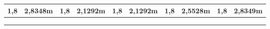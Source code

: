 \begin{center}
\begin{tabular}{cccccccccc}
\multicolumn{1}{|c|}{1,8}                                    & \multicolumn{1}{c|}{2,8348m}                                & \multicolumn{1}{c|}{1,8}                                    & \multicolumn{1}{c|}{2,1292m}                                & \multicolumn{1}{c|}{1,8}                                    & \multicolumn{1}{c|}{2,1292m}                                & \multicolumn{1}{c|}{1,8}                                    & \multicolumn{1}{c|}{2,5528m}                                & \multicolumn{1}{c|}{1,8}                                    & \multicolumn{1}{c|}{2,8349m}                                \\ \hline
\multicolumn{1}{l}{}                                         & \multicolumn{1}{l}{}                                        & \multicolumn{1}{l}{}                                        & \multicolumn{1}{l}{}                                        & \multicolumn{1}{l}{}                                        & \multicolumn{1}{l}{}                                        & \multicolumn{1}{l}{}                                        & \multicolumn{1}{l}{}                                        & \multicolumn{1}{l}{}                                        & \multicolumn{1}{l}{}                                        \\
\multicolumn{1}{l}{}                                         & \multicolumn{1}{l}{}                                        & \multicolumn{1}{l}{}                                        & \multicolumn{1}{l}{}                                        & \multicolumn{1}{l}{}                                        & \multicolumn{1}{l}{}                                        & \multicolumn{1}{l}{}                                        & \multicolumn{1}{l}{}                                        & \multicolumn{1}{l}{}                                        & \multicolumn{1}{l}{}                                        \\
\multicolumn{1}{l}{}                                         & \multicolumn{1}{l}{}                                        & \multicolumn{1}{l}{}                                        & \multicolumn{1}{l}{}                                        & \multicolumn{1}{l}{}                                        & \multicolumn{1}{l}{}                                        & \multicolumn{1}{l}{}                                        & \multicolumn{1}{l}{}                                        & \multicolumn{1}{l}{}                                        & \multicolumn{1}{l}{}                                       
\end{tabular}


\end{center}
